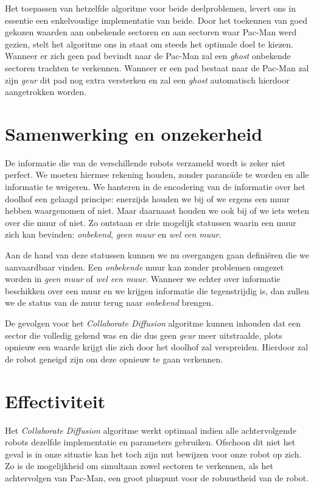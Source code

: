 \documentclass[12pt,a4paper]{report}
\begin{document}
Het toepassen van hetzelfde algoritme voor beide deelproblemen, levert ons in essentie een enkelvoudige implementatie van beide. Door het toekennen van goed gekozen waarden aan onbekende sectoren en aan sectoren waar Pac-Man werd gezien, stelt het algoritme ons in staat om steeds het optimale doel te kiezen. Wanneer er zich geen pad bevindt naar de Pac-Man zal een \emph{ghost} onbekende sectoren trachten te verkennen. Wanneer er een pad bestaat naar de Pac-Man zal zijn \emph{geur} dit pad nog extra versterken en zal een \emph{ghost} automatisch hierdoor aangetrokken worden.

\section{Samenwerking en onzekerheid}

De informatie die van de verschillende robots verzameld wordt is zeker niet perfect. We moeten hiermee rekening houden, zonder parano\"ide te worden en alle informatie te weigeren. We hanteren in de encodering van de informatie over het doolhof een gelaagd principe: enerzijds houden we bij of we ergens een muur hebben waargenomen of niet. Maar daarnaast houden we ook bij of we iets weten over die muur of niet. Zo ontstaan er drie mogelijk statussen waarin een muur zich kan bevinden: \emph{onbekend}, \emph{geen muur} en \emph{wel een muur}.

Aan de hand van deze statussen kunnen we nu overgangen gaan defini\"eren die we aanvaardbaar vinden. Een \emph{onbekende} muur kan zonder problemen omgezet worden in \emph{geen muur} of \emph{wel een muur}. Wanneer we echter over informatie beschikken over een muur en we krijgen informatie die tegenstrijdig is, dan zullen we de status van de muur terug naar \emph{onbekend} brengen.

De gevolgen voor het \emph{Collaborate Diffusion} algoritme kunnen inhouden dat een sector die volledig gekend was en die dus geen \emph{geur} meer uitstraalde, plots opnieuw een waarde krijgt die zich door het doolhof zal verspreiden. Hierdoor zal de robot geneigd zijn om deze opnieuw te gaan verkennen.

\section{Effectiviteit}

Het \emph{Collaborate Diffusion} algoritme werkt optimaal indien alle achtervolgende robots dezelfde implementatie en parameters gebruiken. Ofschoon dit niet het geval is in onze situatie kan het toch zijn nut bewijzen voor onze robot op zich. Zo is de mogelijkheid om simultaan zowel sectoren te verkennen, als het achtervolgen van Pac-Man, een groot pluspunt voor de robuustheid van de robot.
\end{document}
